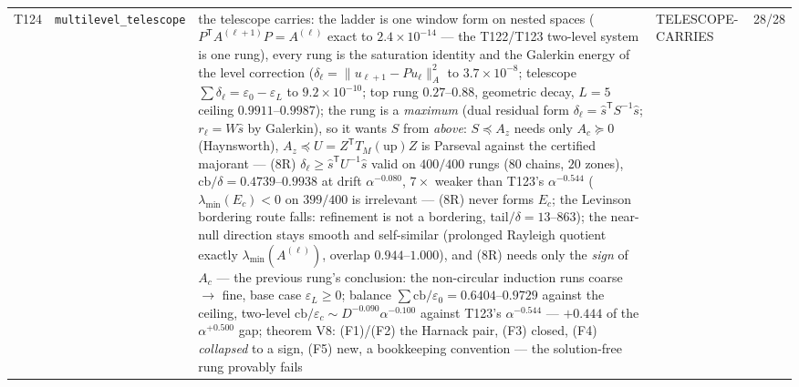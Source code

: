 \documentclass[11pt,a4paper]{article}
\begin{document}
{\begin{xltabular}{\linewidth}{@{}p{0.95cm} >{\raggedright\arraybackslash}p{3.1cm} Y >{\raggedright\scriptsize\arraybackslash}p{3.35cm} p{1.15cm}@{}}
T124 & \texttt{\scriptsize multilevel\_\allowbreak telescope} & the telescope carries: the ladder is one window form on nested spaces ($P^{\mathsf T}A^{(\ell+1)}P=A^{(\ell)}$ exact to $2.4\times10^{-14}$ --- the T122/T123 two-level system is one rung), every rung is the saturation identity and the Galerkin energy of the level correction ($\delta_\ell=\|u_{\ell+1}-Pu_\ell\|^2_A$ to $3.7\times10^{-8}$; telescope $\sum\delta_\ell=\varepsilon_0-\varepsilon_L$ to $9.2\times10^{-10}$; top rung $0.27$--$0.88$, geometric decay, $L=5$ ceiling $0.9911$--$0.9987$); the rung is a \emph{maximum} (dual residual form $\delta_\ell=\hat s^{\mathsf T}S^{-1}\hat s$; $r_\ell=W\hat s$ by Galerkin), so it wants $S$ from \emph{above}: $S\preceq A_z$ needs only $A_c\succeq0$ (Haynsworth), $A_z\preceq U=Z^{\mathsf T}T_M(\mathrm{up})Z$ is Parseval against the certified majorant --- (8R) $\delta_\ell\ge\hat s^{\mathsf T}U^{-1}\hat s$ valid on $400/400$ rungs ($80$ chains, $20$ zones), $\mathrm{cb}/\delta=0.4739$--$0.9938$ at drift $\alpha^{-0.080}$, $7\times$ weaker than T123's $\alpha^{-0.544}$ ($\lambda_{\min}(E_c)<0$ on $399/400$ is irrelevant --- (8R) never forms $E_c$; the Levinson bordering route falls: refinement is not a bordering, tail$/\delta=13$--$863$); the near-null direction stays smooth and self-similar (prolonged Rayleigh quotient exactly $\lambda_{\min}(A^{(\ell)})$, overlap $0.944$--$1.000$), and (8R) needs only the \emph{sign} of $A_c$ --- the previous rung's conclusion: the non-circular induction runs coarse $\to$ fine, base case $\varepsilon_L\ge0$; balance $\sum\mathrm{cb}/\varepsilon_0=0.6404$--$0.9729$ against the ceiling, two-level $\mathrm{cb}/\varepsilon_c\sim D^{-0.090}\alpha^{-0.100}$ against T123's $\alpha^{-0.544}$ --- $+0.444$ of the $\alpha^{+0.500}$ gap; theorem V8: (F1)/(F2) the Harnack pair, (F3) closed, (F4) \emph{collapsed} to a sign, (F5) new, a bookkeeping convention --- the solution-free rung provably fails & TELESCOPE-CARRIES & 28/28\\

\end{xltabular}}
\end{document}
